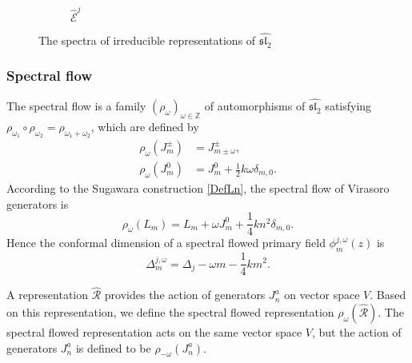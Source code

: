 \documentclass[10pt,a4paper]{article}
\numberwithin{equation}{section}
\begin{document}
\begin{figure}[h]
\begin{subfigure}[b]{0.48\textwidth}
    \caption{$\widehat{\mathcal{E}}^{j}$}
    \label{fig:E}
\end{subfigure}

    \caption{The spectra of irreducible representations of $\widehat{\mathfrak{sl}_{2}}$}
    \label{fig:irrep}
\end{figure}

\subsubsection*{Spectral flow}
The spectral flow is a family $(\rho_{\omega})_{\omega \in \mathbb{Z}}$ of automorphisms of $\widehat{\mathfrak{sl}_{2}}$
satisfying $\rho_{\omega_{1}} \circ \rho_{\omega_{2}}  = \rho_{\omega_{1} + \omega_{2}}$, which are defined by 
\begin{equation}
    \begin{aligned}
        \rho_{\omega}(J^{\pm}_{m}) & = J^{\pm}_{m \pm \omega},\\
        \rho_{\omega}(J^{0}_{m}) & = J^{0}_{m} + \frac{1}{2} k \omega \delta_{m,0}.
    \end{aligned}
\end{equation}
According to the Sugawara construction \eqref{DefLn}, the spectral flow of Virasoro generators is 
\begin{equation}
    \rho_{\omega}(L_{m}) = L_{m} + \omega J^{0}_{m} + \frac{1}{4} k n^{2} \delta_{m,0}.
\end{equation}
Hence the conformal dimension of a spectral flowed primary field $\phi^{j,\omega}_{m}(z)$ is 
\begin{equation}
    \Delta^{j,\omega}_{m} = \Delta_{j} - \omega m - \frac{1}{4} k m^{2}. \label{SpecFlowConDim}
\end{equation}

A representation $\widehat{\mathcal{R}} $ provides the action of generators $J^{a}_{n}$ on vector space $V$. Based on this representation, 
we define the spectral flowed representation $\rho_{\omega}\left(\widehat{\mathcal{R}}\right)$. The spectral flowed representation acts on the 
same vector space $V$, but the action of generators $J^{a}_{n}$ is defined to be $\rho_{-\omega}\left(J^{a}_{n}\right)$. 
\end{document}
